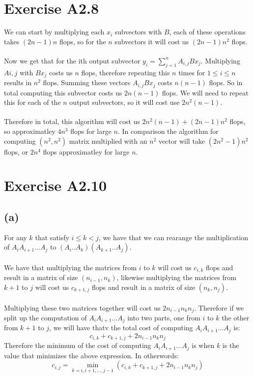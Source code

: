 \section*{Exercise A2.8}
We can start by multiplying each $x_i$ subvectors with $B$, each of these operations takes $(2n-1)n$ flops, so for the $n$ subvectors it will cost us $(2n-1)n^2$ flops.
\\\\Now we get that for the ith output subvector $y_i=\sum_{j=1}^{n}A_{i,j}Bx_j$. Multiplying $A{i,j}$ with $Bx_j$ costs us $n$ flops, therefore repeating this $n$ times for 
$1\leq i \leq n$ results in $n^2$ flops. Summing these vectors $A_{i,j}Bx_j$ costs $n(n-1)$ flops. So in total computing this subvector costs us $2n(n-1)$ flops. We will need to repeat this for each of the $n$ output subvectors, so it will cost use $2n^2(n-1)$.\\\\
Therefore in total, this algorithm will cost us $2n^2(n-1)+(2n-1)n^2$ flops, so approximatley $4n^3$ flops for large $n$. In comparison the algorithm for computing $(n^2,n^2)$ matrix multiplied with an $n^2$ vector will take $(2n^2-1)n^2$ flops, or $2n^4$ flops approximatley for large $n$.
\section*{Exercise A2.10}
\subsection*{(a)}
For any $k$ that satisfy $i\leq k < j$, we have that we can rearange the multiplication of $A_iA_{i+1}...A_{j}$ to $(A_i..A_k)(A_{k+1}..A_j)$.\\\\
We have that multiplying the matrices from $i$ to $k$ will cost us $c_{i,k}$ flops and result in a
matrix of size $(n_{i-1},n_k)$, likewise multiplying the matrices from $k+1$ to $j$ will cost us $c_{k+1,j}$ flops and result in a matrix of size $(n_{k},n_j)$.\\\\
Multiplying these two matrices together will cost us $2n_{i-1}n_kn_j$. Therefore if we split up the computation of 
$A_iA_{i+1}...A_{j}$ into two parts, one from $i$ to $k$ the other from $k+1$ to $j$, we will have thatv the total cost of computing $A_iA_{i+1}...A_{j}$ is:
$$c_{i,k}+c_{k+1,j}+2n_{i-1}n_kn_j$$
Therefore the minimum of the cost of computing $A_iA_{i+1}...A_{j}$ is when $k$ is the value that minimizes the above expression. In otherwords:
$$c_{i,j}=\min_{k=i,i+1,...,j-1}(c_{i,k}+c_{k+1,j}+2n_{i-1}n_kn_j)$$
